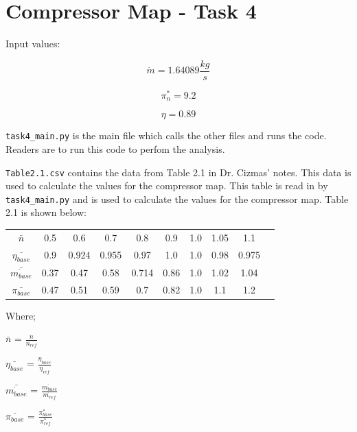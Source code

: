 \documentclass[titlepage]{article}
\begin{document}
\vspace{7cm}

\section{Compressor Map - Task 4}

Input values:

\begin{equation}
    \dot{m} = 1.64089 \frac{kg}{s} 
\end{equation}

\begin{equation}
    \pi^{*}_{n} = 9.2
\end{equation}

\begin{equation}
    \eta = 0.89 
\end{equation}

\verb|task4_main.py| is the main file which calls the other files and runs the code. Readers are to run this code to perfom the analysis.

\vspace*{3pt}

\verb|Table2.1.csv| contains the data from Table 2.1 in Dr. Cizmas' notes. This data is used to calculate the values for the compressor map. This table is read in by \verb|task4_main.py| and is used to calculate the values for the compressor map. Table 2.1 is shown below:

\begin{center}
    \begin{tabular}{ c c c c c c c c c c }
     $\bar{n}$ & 0.5 & 0.6 & 0.7 & 0.8 & 0.9 & 1.0 & 1.05 & 1.1 \\ 
        $\bar{\eta_{base}}$ & 0.9 & 0.924 & 0.955 & 0.97 & 1.0 & 1.0 & 0.98 & 0.975 \\
        $\bar{\dot{m_{base}}}$ & 0.37 & 0.47 & 0.58 & 0.714 & 0.86 & 1.0 & 1.02 & 1.04 \\
        $\bar{\pi_{base}}$ & 0.47 & 0.51 & 0.59 & 0.7 & 0.82 & 1.0 & 1.1 & 1.2 \\
    \end{tabular}
    \end{center}

\vspace*{3pt}

Where; 
\begin{center}
    $\bar{n}$ = $\frac{n}{n_{ref}}$ 

    \vspace*{3pt}

    $\bar{\eta_{base}}$ = $\frac{\eta_{base}}{\eta_{ref}}$
    
    \vspace*{3pt}
    
    $\bar{\dot{m_{base}}}$ = $\frac{\dot{m_{base}}}{\dot{m_{ref}}}$
    
    \vspace*{3pt}
    
    $\bar{\pi_{base}}$ = $\frac{\pi^* _{base}}{\pi^* _{ref}}$
\end{center}
\end{document}
